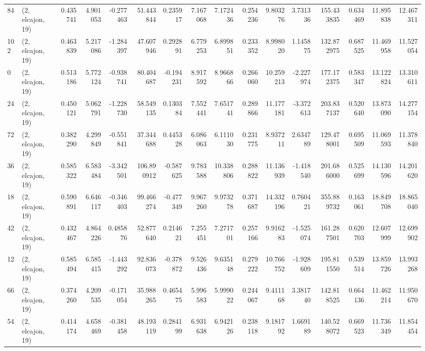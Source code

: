 \begin{tabular}{llrrrrrrrrrrrrrr}
84  &  (2, elcajon, 19) &   0.435741 &   4.901053 &  -0.277463 &    51.443844 &   0.235917 &   7.167068 &   7.172436 &  0.254236 &   9.803276 &   3.731336 &   155.433835 &  0.634469 &  11.895838 &  12.467311 \\
102 &  (2, elcajon, 19) &   0.463839 &   5.217086 &  -1.284397 &    47.607946 &   0.292891 &   6.779253 &   6.899851 &  0.233352 &   8.998020 &   1.145875 &   132.872975 &  0.687525 &  11.469958 &  11.527054 \\
0   &  (2, elcajon, 19) &   0.513186 &   5.772124 &  -0.938741 &    80.404687 &  -0.194231 &   8.917592 &   8.966866 &  0.266060 &  10.259213 &  -2.227974 &   177.172375 &  0.583347 &  13.122824 &  13.310611 \\
24  &  (2, elcajon, 19) &   0.450121 &   5.062791 &  -1.228730 &    58.549135 &   0.130384 &   7.552441 &   7.651741 &  0.289866 &  11.177181 &  -3.372613 &   203.837137 &  0.520640 &  13.873090 &  14.277154 \\
72  &  (2, elcajon, 19) &   0.382290 &   4.299849 &  -0.551841 &    37.344688 &   0.445328 &   6.086063 &   6.111030 &  0.231775 &   8.937211 &   2.634789 &   129.478001 &  0.695509 &  11.069593 &  11.378840 \\
36  &  (2, elcajon, 19) &   0.585322 &   6.583484 &  -3.342501 &   106.890912 &  -0.587625 &   9.783588 &  10.338806 &  0.288822 &  11.136939 &  -1.418540 &   201.686000 &  0.525699 &  14.130596 &  14.201620 \\
18  &  (2, elcajon, 19) &   0.590891 &   6.646117 &  -0.346403 &    99.466274 &  -0.477349 &   9.967260 &   9.973278 &  0.371687 &  14.332196 &   0.760421 &   355.889732 &  0.163061 &  18.849708 &  18.865040 \\
42  &  (2, elcajon, 19) &   0.432467 &   4.864226 &   0.485876 &    52.877640 &   0.214621 &   7.255451 &   7.271701 &  0.257166 &   9.916283 &  -1.525074 &   161.287501 &  0.620703 &  12.607999 &  12.699902 \\
12  &  (2, elcajon, 19) &   0.585494 &   6.585415 &  -1.443292 &    92.836073 &  -0.378872 &   9.526436 &   9.635148 &  0.279222 &  10.766752 &  -1.928609 &   195.811550 &  0.539514 &  13.859726 &  13.993268 \\
66  &  (2, elcajon, 19) &   0.374260 &   4.209535 &  -0.171054 &    35.988265 &   0.465475 &   5.996583 &   5.999022 &  0.244067 &   9.411168 &   3.381740 &   142.818525 &  0.664136 &  11.462214 &  11.950670 \\
54  &  (2, elcajon, 19) &   0.414174 &   4.658469 &  -0.381458 &    48.193119 &   0.284199 &   6.931638 &   6.942126 &  0.238118 &   9.181792 &   1.669189 &   140.528072 &  0.669523 &  11.736349 &  11.854454 \\

\end{tabular}
